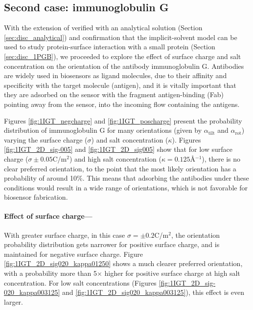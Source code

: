  \subsection{Second case: immunoglobulin G}
 
 With the extension of \pygbe verified with an analytical solution (Section \ref{sec:disc_analytical}) and confirmation that the implicit-solvent model can be used to study protein-surface interaction with a small protein (Section \ref{sec:disc_1PGB}), we proceeded to explore the effect of surface charge and salt concentration on the orientation of the antibody immunoglobulin G. Antibodies are widely used in biosensors as ligand molecules, due to their affinity and specificity with the target molecule (antigen), and it is vitally important that they are adsorbed on the sensor with the fragment antigen-binding (Fab) pointing away from the sensor, into the incoming flow containing the antigens.
 
 Figures \ref{fig:1IGT_negcharge} and \ref{fig:1IGT_poscharge} present the probability distribution of immunoglobulin G for many orientations (given by $\alpha_\text{tilt}$ and $\alpha_\text{rot}$) varying the surface charge ($\sigma$) and salt concentration ($\kappa$). Figures \ref{fig:1IGT_2D_sig-005} and \ref{fig:1IGT_2D_sig005} show that for low surface charge ($\sigma \pm 0.05$C/m$^2$) and high salt concentration ($\kappa=0.125$\AA$^{-1}$), there is no clear preferred orientation, to the point that the most likely orientation has a probability of around 10\%. This means that adsorbing the antibodies under these conditions would result in a wide range of orientations, which is not favorable for biosensor fabrication.
 
 \medskip
 
 \paragraph*{Effect of surface charge---}
 
 With greater surface charge, in this case $\sigma=\pm0.2$C/m$^2$, the orientation probability distribution gets narrower for positive surface charge, and is maintained for negative surface charge. Figure \ref{fig:1IGT_2D_sig020_kappa01250} shows a much clearer preferred orientation, with a probability more than 5$\times$ higher for positive surface charge at high salt concentration. For low salt concentrations (Figures \ref{fig:1IGT_2D_sig-020_kappa003125} and \ref{fig:1IGT_2D_sig020_kappa003125}), this effect is even larger. 
 
